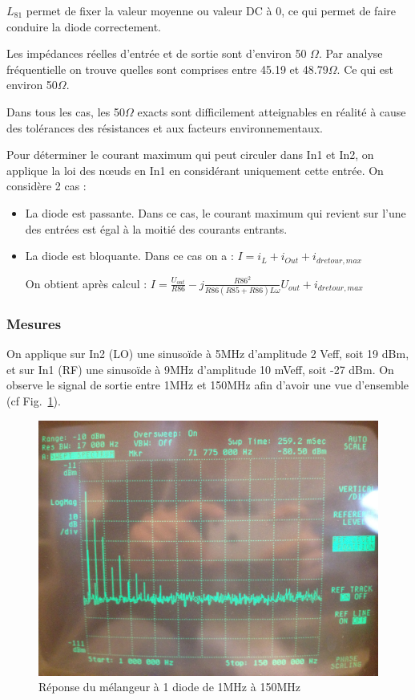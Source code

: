 \documentclass{article}
\begin{document}
$L_{81}$ permet de fixer la valeur moyenne ou valeur DC à 0, ce qui permet de faire conduire la diode correctement.


Les impédances réelles d'entrée et de sortie sont d'environ 50 $\Omega$. Par analyse fréquentielle on trouve quelles sont comprises entre 45.19 et 48.79$\Omega$. Ce qui est environ 50$\Omega$.

Dans tous les cas, les 50$\Omega$ exacts sont difficilement atteignables en réalité à cause des tolérances des résistances et aux facteurs environnementaux.


Pour déterminer le courant maximum qui peut circuler dans In1 et In2, on applique la loi des nœuds en In1 en considérant uniquement cette entrée.
On considère 2 cas :
\begin{itemize}
\item La diode est passante. Dans ce cas, le courant maximum qui revient sur l'une des entrées est égal à la moitié des courants entrants.

\item La diode est bloquante. Dans ce cas on a :
$I=i_{L}+i_{Out}+i_{dretour,max}$

On obtient après calcul :
$I=\frac{U_{out}}{R86}-j\frac{R86^2}{R86(R85+R86)L\omega}U_{out}+i_{dretour,max}$

\end{itemize}

\subsubsection{Mesures}


On applique sur In2 (LO) une sinusoïde à 5MHz d'amplitude 2 Veff, soit 19 dBm, et sur In1 (RF) une sinusoïde à 9MHz d'amplitude 10 mVeff, soit -27 dBm.
On observe le signal de sortie entre 1MHz et 150MHz afin d'avoir une vue d'ensemble (cf Fig.~\ref{fig:11_3_1}).

\begin{figure}[h!]
	\centering
	\includegraphics[width=.7\textwidth]{11_3_1}
	\caption{Réponse du mélangeur à 1 diode de 1MHz à 150MHz}
	\label{fig:11_3_1}
\end{figure}
\end{document}
